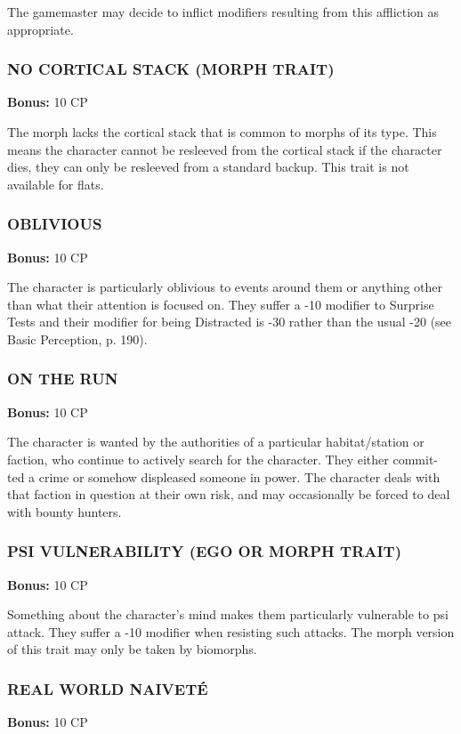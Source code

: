 The gamemaster may decide to inflict modifiers resulting from this affliction
as appropriate.

\subsubsection{NO CORTICAL STACK (MORPH TRAIT)}
\textbf{Bonus:} 10 CP

The morph lacks the cortical stack that is common to morphs of its type. This
means the character cannot be resleeved from the cortical stack if the
character dies, they can only be resleeved from a standard backup. This trait
is not available for flats.

\subsubsection{OBLIVIOUS}
\textbf{Bonus:} 10 CP

The character is particularly oblivious to events around them or anything other
than what their attention is focused on. They suffer a -10 modifier to Surprise
Tests and their modifier for being Distracted is -30 rather than the usual -20
(see Basic Perception, p. 190).

\subsubsection{ON THE RUN}
\textbf{Bonus:} 10 CP

The character is wanted by the authorities of a particular habitat/station or
faction, who continue to actively search for the character. They either commit-
ted a crime or somehow displeased someone in power.  The character deals with
that faction in question at their own risk, and may occasionally be forced to
deal with bounty hunters.

\subsubsection{PSI VULNERABILITY (EGO OR MORPH TRAIT)}
\textbf{Bonus:} 10 CP

Something about the character’s mind makes them particularly vulnerable to psi
attack. They suffer a -10 modifier when resisting such attacks.  The morph
version of this trait may only be taken by biomorphs.

\subsubsection{REAL WORLD NAIVET\'{E}}
\textbf{Bonus:} 10 CP

